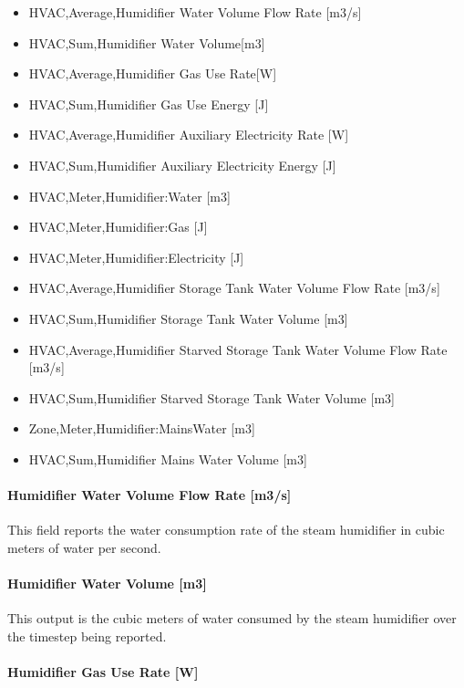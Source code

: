\begin{itemize}
\tightlist
\item
  HVAC,Average,Humidifier Water Volume Flow Rate {[}m3/s{]}
\item
  HVAC,Sum,Humidifier Water Volume{[}m3{]}
\item
  HVAC,Average,Humidifier Gas Use Rate{[}W{]}
\item
  HVAC,Sum,Humidifier Gas Use Energy {[}J{]}
\item
  HVAC,Average,Humidifier Auxiliary Electricity Rate {[}W{]}
\item
  HVAC,Sum,Humidifier Auxiliary Electricity Energy {[}J{]}
\item
  HVAC,Meter,Humidifier:Water {[}m3{]}
\item
  HVAC,Meter,Humidifier:Gas {[}J{]}
\item
  HVAC,Meter,Humidifier:Electricity {[}J{]}
\item
  HVAC,Average,Humidifier Storage Tank Water Volume Flow Rate {[}m3/s{]}
\item
  HVAC,Sum,Humidifier Storage Tank Water Volume {[}m3{]}
\item
  HVAC,Average,Humidifier Starved Storage Tank Water Volume Flow Rate {[}m3/s{]}
\item
  HVAC,Sum,Humidifier Starved Storage Tank Water Volume {[}m3{]}
\item
  Zone,Meter,Humidifier:MainsWater {[}m3{]}
\item
  HVAC,Sum,Humidifier Mains Water Volume {[}m3{]}
\end{itemize}

\paragraph{Humidifier Water Volume Flow Rate {[}m3/s{]}}\label{humidifier-water-volume-flow-rate-m3s-1}

This field reports the water consumption rate of the steam humidifier in cubic meters of water per second.

\paragraph{Humidifier Water Volume {[}m3{]}}\label{humidifier-water-volume-m3}

This output is the cubic meters of water consumed by the steam humidifier over the timestep being reported.

\paragraph{Humidifier Gas Use Rate {[}W{]}}\label{humidifier-gas-use-rate-w}

